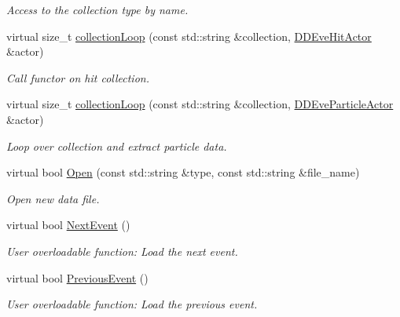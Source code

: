 \begin{DoxyCompactItemize}
\begin{DoxyCompactList}\small\item\em Access to the collection type by name. \item\end{DoxyCompactList}\item 
virtual size\_\-t \hyperlink{class_d_d4hep_1_1_d_d_g4_event_handler_a65645df58f694dea050f7d57d353dff4}{collectionLoop} (const std::string \&collection, \hyperlink{struct_d_d4hep_1_1_d_d_eve_hit_actor}{DDEveHitActor} \&actor)
\begin{DoxyCompactList}\small\item\em Call functor on hit collection. \item\end{DoxyCompactList}\item 
virtual size\_\-t \hyperlink{class_d_d4hep_1_1_d_d_g4_event_handler_a9f45863ae9406f8d5ec1d309321c50d6}{collectionLoop} (const std::string \&collection, \hyperlink{struct_d_d4hep_1_1_d_d_eve_particle_actor}{DDEveParticleActor} \&actor)
\begin{DoxyCompactList}\small\item\em Loop over collection and extract particle data. \item\end{DoxyCompactList}\item 
virtual bool \hyperlink{class_d_d4hep_1_1_d_d_g4_event_handler_a110e487b2813985f56058382357f0754}{Open} (const std::string \&type, const std::string \&file\_\-name)
\begin{DoxyCompactList}\small\item\em Open new data file. \item\end{DoxyCompactList}\item 
virtual bool \hyperlink{class_d_d4hep_1_1_d_d_g4_event_handler_a02ecd0dfced58988ab84242cb9fdfd44}{NextEvent} ()
\begin{DoxyCompactList}\small\item\em User overloadable function: Load the next event. \item\end{DoxyCompactList}\item 
virtual bool \hyperlink{class_d_d4hep_1_1_d_d_g4_event_handler_a20cafa8eac655886d4a3d69338e7e947}{PreviousEvent} ()
\begin{DoxyCompactList}\small\item\em User overloadable function: Load the previous event. \item\end{DoxyCompactList}\item 

\end{DoxyCompactItemize}
